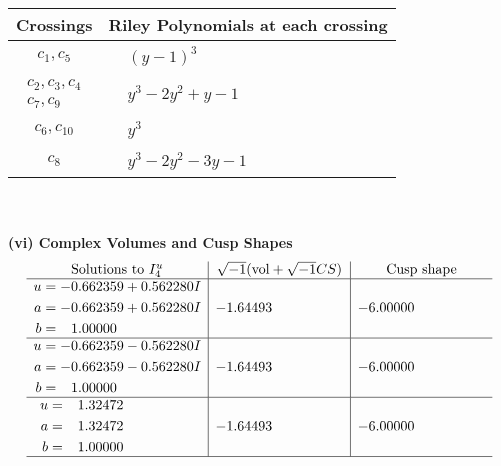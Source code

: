 \documentclass[1p]{elsarticle_modified}
\theoremstyle{definition}
\newcommand{\I}{\sqrt{-1}}
\begin{document}
\begin{tabular}{m{50pt}|m{274pt}}
Crossings & \hspace{64pt}Riley Polynomials at each crossing \\
\hline $$\begin{aligned}c_{1},c_{5}\end{aligned}$$&$\begin{aligned}
&(y-1)^3
\end{aligned}$\\
\hline $$\begin{aligned}c_{2},c_{3},c_{4}\\c_{7},c_{9}\end{aligned}$$&$\begin{aligned}
&y^3-2 y^2+y-1
\end{aligned}$\\
\hline $$\begin{aligned}c_{6},c_{10}\end{aligned}$$&$\begin{aligned}
&y^3
\end{aligned}$\\
\hline $$\begin{aligned}c_{8}\end{aligned}$$&$\begin{aligned}
&y^3-2 y^2-3 y-1
\end{aligned}$\\
\hline
\end{tabular}\\~\\
\newpage\flushleft \textbf{(vi) Complex Volumes and Cusp Shapes}
$$\begin{array}{c|c|c}  
\text{Solutions to }I^u_{4}& \I (\text{vol} + \sqrt{-1}CS) & \text{Cusp shape}\\
 \hline 
\begin{aligned}
u &= -0.662359 + 0.562280 I \\
a &= -0.662359 + 0.562280 I \\
b &= \phantom{-}1.00000\phantom{ +0.000000I}\end{aligned}
 & -1.64493\phantom{ +0.000000I} & -6.00000\phantom{ +0.000000I} \\ \hline\begin{aligned}
u &= -0.662359 - 0.562280 I \\
a &= -0.662359 - 0.562280 I \\
b &= \phantom{-}1.00000\phantom{ +0.000000I}\end{aligned}
 & -1.64493\phantom{ +0.000000I} & -6.00000\phantom{ +0.000000I} \\ \hline\begin{aligned}
u &= \phantom{-}1.32472\phantom{ +0.000000I} \\
a &= \phantom{-}1.32472\phantom{ +0.000000I} \\
b &= \phantom{-}1.00000\phantom{ +0.000000I}\end{aligned}
 & -1.64493\phantom{ +0.000000I} & -6.00000\phantom{ +0.000000I}\\
 \hline 
 \end{array}$$\newpage\newpage\renewcommand{\arraystretch}{1}
\end{document}
